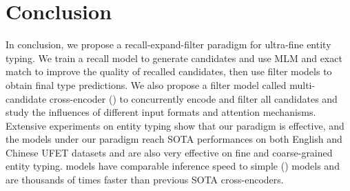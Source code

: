\section{Conclusion}
In conclusion, we propose a recall-expand-filter paradigm for ultra-fine entity typing. We train a recall model to generate candidates and use MLM and exact match to improve the quality of recalled candidates, then use filter models to obtain final type predictions. We also propose a filter model called multi-candidate cross-encoder ({\bf \textsc{\name}}) to concurrently encode and filter all candidates and study the influences of different input formats and attention mechanisms. Extensive experiments on entity typing show that our paradigm is effective, and the {\bf \textsc{\name}} models under our paradigm reach SOTA performances on both English and Chinese UFET datasets and are also very effective on fine and coarse-grained entity typing.  {\bf \textsc{\name}} models have comparable inference speed to simple ({\bf \textsc{\name}})  models and are thousands of times faster than previous SOTA cross-encoders.